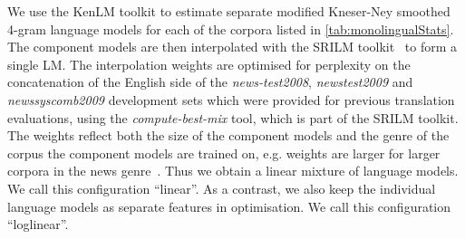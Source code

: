 We use the KenLM toolkit to
estimate separate modified Kneser-Ney smoothed 4-gram
language models for each of the
corpora listed in \autoref{tab:monolingualStats}. The component models are then
interpolated with the SRILM toolkit~\citep{stolcke:2002:SLP} to form a single LM.
The interpolation weights are optimised for perplexity on the
concatenation of the English side of the \emph{news-test2008},
\emph{newstest2009} and \emph{newssyscomb2009} development sets which were provided
for previous translation evaluations, using
the \emph{compute-best-mix} tool, which is part of the SRILM toolkit.
The weights reflect
both the size of the component models and the genre of the corpus the component models
are trained on, e.g. weights are larger for larger corpora in the news
genre~\citep{foster-chen-kuhn:2013:MTSummit}.
Thus we obtain a linear mixture of language models. We call this configuration ``linear''.
As a contrast, we also keep the individual language models as separate features
in optimisation. We call this configuration ``loglinear''.

